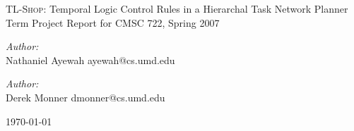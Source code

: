 \begin{titlepage}

\begin{center}

{\LARGE \textsc{TL-Shop}: Temporal Logic Control Rules in a Hierarchal Task Network Planner}\\[5cm]

{\Large Term Project Report for CMSC 722, Spring 2007}\\[3cm]


\begin{minipage}{0.4\textwidth}
\begin{flushleft} \large
\emph{Author:}\\
Nathaniel Ayewah
ayewah@cs.umd.edu
\end{flushleft}
\end{minipage}
\begin{minipage}{0.4\textwidth}
\begin{flushright} \large
\emph{Author:} \\
Derek Monner
dmonner@cs.umd.edu
\end{flushright}
\end{minipage}

\vfill

{\large \today}

\end{center}

\end{titlepage}
